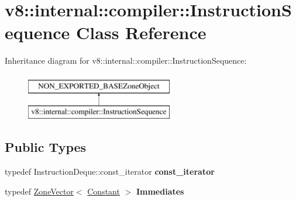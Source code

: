\hypertarget{classv8_1_1internal_1_1compiler_1_1InstructionSequence}{}\section{v8\+:\+:internal\+:\+:compiler\+:\+:Instruction\+Sequence Class Reference}
\label{classv8_1_1internal_1_1compiler_1_1InstructionSequence}
Inheritance diagram for v8\+:\+:internal\+:\+:compiler\+:\+:Instruction\+Sequence\+:\begin{figure}[H]
\begin{center}
\leavevmode
\includegraphics[height=2.000000cm]{classv8_1_1internal_1_1compiler_1_1InstructionSequence}
\end{center}
\end{figure}
\subsection*{Public Types}
\begin{DoxyCompactItemize}
\item 
\mbox{\label{classv8_1_1internal_1_1compiler_1_1InstructionSequence_ab15b72b20e24e09dd5d2eca12113a265}} 
typedef Instruction\+Deque\+::const\+\_\+iterator {\bfseries const\+\_\+iterator}
\item 
\mbox{\label{classv8_1_1internal_1_1compiler_1_1InstructionSequence_a454e726f151fd3538e4f3aa468844460}} 
typedef \mbox{\hyperlink{classv8_1_1internal_1_1ZoneVector}{Zone\+Vector}}$<$ \mbox{\hyperlink{classv8_1_1internal_1_1compiler_1_1Constant}{Constant}} $>$ {\bfseries Immediates}
\end{DoxyCompactItemize}
